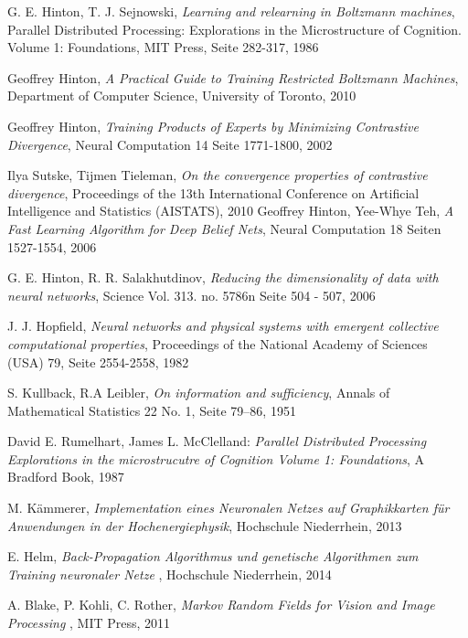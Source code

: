\documentclass[12pt]{article}
\begin{document}
\newpage
\begin{thebibliography}{9}

G. E. Hinton, T. J. Sejnowski,
\emph{Learning and relearning in Boltzmann machines}, 
Parallel Distributed Processing: Explorations in the Microstructure of Cognition. Volume 1: Foundations, MIT Press, Seite 282-317, 1986

Geoffrey Hinton,
\emph{A Practical Guide to Training Restricted Boltzmann Machines},
Department of Computer Science, 
University of Toronto,
2010

Geoffrey Hinton,
\emph{Training Products of Experts by Minimizing Contrastive Divergence},
Neural Computation 14 Seite 1771-1800,
2002

Ilya Sutske, Tijmen Tieleman,
\emph{On the convergence properties of contrastive divergence},
Proceedings of the 13th International Conference on Artificial Intelligence and Statistics (AISTATS),
2010 
Geoffrey Hinton, Yee-Whye Teh,
\emph{A Fast Learning Algorithm for Deep Belief Nets},
Neural Computation 18 Seiten 1527-1554,
2006

G. E. Hinton, R. R. Salakhutdinov,
\emph{Reducing the dimensionality of data with neural networks},
Science Vol. 313. no. 5786n Seite 504 - 507,
2006

J. J. Hopfield,
 \emph{Neural networks and physical systems with emergent collective computational properties},
Proceedings of the National Academy of Sciences (USA) 79, Seite 2554-2558,
1982

 S. Kullback, R.A Leibler,
\emph{On information and sufficiency},
Annals of Mathematical Statistics 22 No. 1,
Seite  79–86,
 1951
 
 David E. Rumelhart, James L. McClelland: {\em Parallel Distributed Processing Explorations in the microstrucutre of Cognition Volume 1: Foundations}, A Bradford Book, 1987

M. Kämmerer, \emph{Implementation eines Neuronalen Netzes auf Graphikkarten für Anwendungen in der Hochenergiephysik}, Hochschule Niederrhein, 2013

E. Helm, \emph{Back-Propagation Algorithmus und genetische
Algorithmen zum Training neuronaler Netze
}, Hochschule Niederrhein, 2014

A. Blake, P. Kohli, C. Rother,
\emph{Markov Random Fields for Vision and Image Processing}
, MIT Press, 2011

\end{thebibliography}
\newpage
\listoffigures
\end{document}
